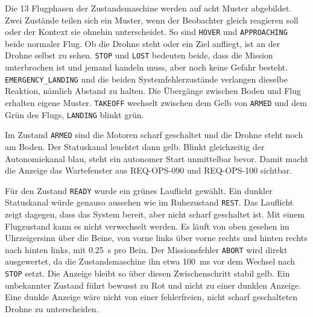             Die 13 Flugphasen der Zustandsmaschine werden auf acht Muster abgebildet. Zwei Zustände teilen sich ein Muster, wenn der Beobachter gleich reagieren soll oder der Kontext sie ohnehin unterscheidet. So sind \texttt{HOVER} und \texttt{APPROACHING} beide normaler Flug. Ob die Drohne steht oder ein Ziel anfliegt, ist an der Drohne selbst zu sehen. \texttt{STOP} und \texttt{LOST} bedeuten beide, dass die Mission unterbrochen ist und jemand handeln muss, aber noch keine Gefahr besteht. \texttt{EMERGENCY\_LANDING} und die beiden Systemfehlerzustände verlangen dieselbe Reaktion, nämlich Abstand zu halten. Die Übergänge zwischen Boden und Flug erhalten eigene Muster. \texttt{TAKEOFF} wechselt zwischen dem Gelb von \texttt{ARMED} und dem Grün des Flugs, \texttt{LANDING} blinkt grün.

            Im Zustand \texttt{ARMED} sind die Motoren scharf geschaltet und die Drohne steht noch am Boden. Der Statuskanal leuchtet dann gelb. Blinkt gleichzeitig der Autonomiekanal blau, steht ein autonomer Start unmittelbar bevor. Damit macht die Anzeige das Wartefenster aus REQ-OPS-090 und REQ-OPS-100 sichtbar.

            Für den Zustand \texttt{READY} wurde ein grünes Lauflicht gewählt. Ein dunkler Statuskanal würde genauso aussehen wie im Ruhezustand \texttt{REST}. Das Lauflicht zeigt dagegen, dass das System bereit, aber nicht scharf geschaltet ist. Mit einem Flugzustand kann es nicht verwechselt werden. Es läuft von oben gesehen im Uhrzeigersinn über die Beine, von vorne links über vorne rechts und hinten rechts nach hinten links, mit \SI{0,25}{\second} pro Bein. Der Missionsfehler \texttt{ABORT} wird direkt ausgewertet, da die Zustandsmaschine ihn etwa \SI{100}{\milli\second} vor dem Wechsel nach \texttt{STOP} setzt. Die Anzeige bleibt so über diesen Zwischenschritt stabil gelb. Ein unbekannter Zustand führt bewusst zu Rot und nicht zu einer dunklen Anzeige. Eine dunkle Anzeige wäre nicht von einer fehlerfreien, nicht scharf geschalteten Drohne zu unterscheiden.

